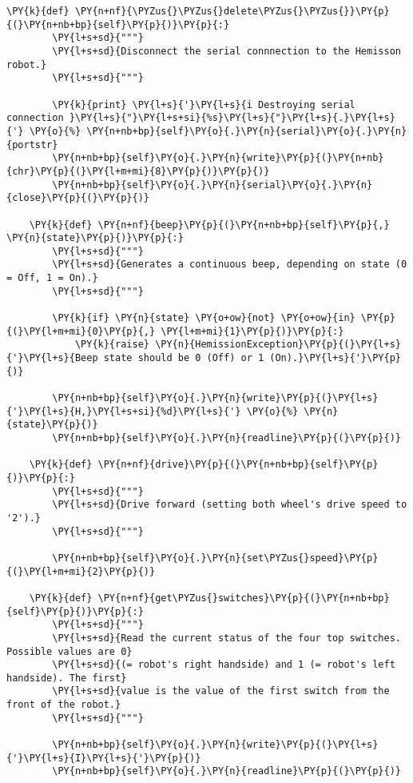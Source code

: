 \begin{Verbatim}[commandchars=\\\{\}]
    \PY{k}{def} \PY{n+nf}{\PYZus{}\PYZus{}delete\PYZus{}\PYZus{}}\PY{p}{(}\PY{n+nb+bp}{self}\PY{p}{)}\PY{p}{:}
        \PY{l+s+sd}{"""}
        \PY{l+s+sd}{Disconnect the serial connnection to the Hemisson robot.}
        \PY{l+s+sd}{"""}

        \PY{k}{print} \PY{l+s}{'}\PY{l+s}{i Destroying serial connection }\PY{l+s}{"}\PY{l+s+si}{%s}\PY{l+s}{"}\PY{l+s}{.}\PY{l+s}{'} \PY{o}{%} \PY{n+nb+bp}{self}\PY{o}{.}\PY{n}{serial}\PY{o}{.}\PY{n}{portstr}
        \PY{n+nb+bp}{self}\PY{o}{.}\PY{n}{write}\PY{p}{(}\PY{n+nb}{chr}\PY{p}{(}\PY{l+m+mi}{8}\PY{p}{)}\PY{p}{)}
        \PY{n+nb+bp}{self}\PY{o}{.}\PY{n}{serial}\PY{o}{.}\PY{n}{close}\PY{p}{(}\PY{p}{)}

    \PY{k}{def} \PY{n+nf}{beep}\PY{p}{(}\PY{n+nb+bp}{self}\PY{p}{,} \PY{n}{state}\PY{p}{)}\PY{p}{:}
        \PY{l+s+sd}{"""}
        \PY{l+s+sd}{Generates a continuous beep, depending on state (0 = Off, 1 = On).}
        \PY{l+s+sd}{"""}

        \PY{k}{if} \PY{n}{state} \PY{o+ow}{not} \PY{o+ow}{in} \PY{p}{(}\PY{l+m+mi}{0}\PY{p}{,} \PY{l+m+mi}{1}\PY{p}{)}\PY{p}{:}
            \PY{k}{raise} \PY{n}{HemissionException}\PY{p}{(}\PY{l+s}{'}\PY{l+s}{Beep state should be 0 (Off) or 1 (On).}\PY{l+s}{'}\PY{p}{)}

        \PY{n+nb+bp}{self}\PY{o}{.}\PY{n}{write}\PY{p}{(}\PY{l+s}{'}\PY{l+s}{H,}\PY{l+s+si}{%d}\PY{l+s}{'} \PY{o}{%} \PY{n}{state}\PY{p}{)}
        \PY{n+nb+bp}{self}\PY{o}{.}\PY{n}{readline}\PY{p}{(}\PY{p}{)}

    \PY{k}{def} \PY{n+nf}{drive}\PY{p}{(}\PY{n+nb+bp}{self}\PY{p}{)}\PY{p}{:}
        \PY{l+s+sd}{"""}
        \PY{l+s+sd}{Drive forward (setting both wheel's drive speed to '2').}
        \PY{l+s+sd}{"""}

        \PY{n+nb+bp}{self}\PY{o}{.}\PY{n}{set\PYZus{}speed}\PY{p}{(}\PY{l+m+mi}{2}\PY{p}{)}

    \PY{k}{def} \PY{n+nf}{get\PYZus{}switches}\PY{p}{(}\PY{n+nb+bp}{self}\PY{p}{)}\PY{p}{:}
        \PY{l+s+sd}{"""}
        \PY{l+s+sd}{Read the current status of the four top switches. Possible values are 0}
        \PY{l+s+sd}{(= robot's right handside) and 1 (= robot's left handside). The first}
        \PY{l+s+sd}{value is the value of the first switch from the front of the robot.}
        \PY{l+s+sd}{"""}

        \PY{n+nb+bp}{self}\PY{o}{.}\PY{n}{write}\PY{p}{(}\PY{l+s}{'}\PY{l+s}{I}\PY{l+s}{'}\PY{p}{)}
        \PY{n+nb+bp}{self}\PY{o}{.}\PY{n}{readline}\PY{p}{(}\PY{p}{)}


\end{Verbatim}
